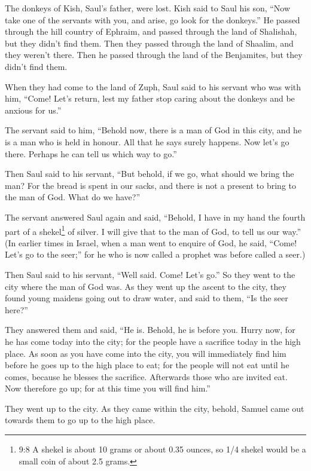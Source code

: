  The donkeys of Kish, Saul's father, were lost. Kish said to
Saul his son, ``Now take one of the servants with you, and arise, go
look for the donkeys.''  He passed through the hill country
of Ephraim, and passed through the land of Shalishah, but they didn't
find them. Then they passed through the land of Shaalim, and they
weren't there. Then he passed through the land of the Benjamites, but
they didn't find them.

 When they had come to the land of Zuph, Saul said to his
servant who was with him, ``Come! Let's return, lest my father stop
caring about the donkeys and be anxious for us.''

 The servant said to him, ``Behold now, there is a man of
God in this city, and he is a man who is held in honour. All that he
says surely happens. Now let's go there. Perhaps he can tell us which
way to go.''

 Then Saul said to his servant, ``But behold, if we go, what
should we bring the man? For the bread is spent in our sacks, and there
is not a present to bring to the man of God. What do we have?''

 The servant answered Saul again and said, ``Behold, I have
in my hand the fourth part of a shekel\footnote{9:8 A shekel is about 10
  grams or about 0.35 ounces, so 1/4 shekel would be a small coin of
  about 2.5 grams.} of silver. I will give that to the man of God, to
tell us our way.''  (In earlier times in Israel, when a man
went to enquire of God, he said, ``Come! Let's go to the seer;'' for he
who is now called a prophet was before called a seer.)

 Then Saul said to his servant, ``Well said. Come! Let's
go.'' So they went to the city where the man of God was. 
As they went up the ascent to the city, they found young maidens going
out to draw water, and said to them, ``Is the seer here?''

 They answered them and said, ``He is. Behold, he is before
you. Hurry now, for he has come today into the city; for the people have
a sacrifice today in the high place.  As soon as you have
come into the city, you will immediately find him before he goes up to
the high place to eat; for the people will not eat until he comes,
because he blesses the sacrifice. Afterwards those who are invited eat.
Now therefore go up; for at this time you will find him.''

 They went up to the city. As they came within the city,
behold, Samuel came out towards them to go up to the high place.

